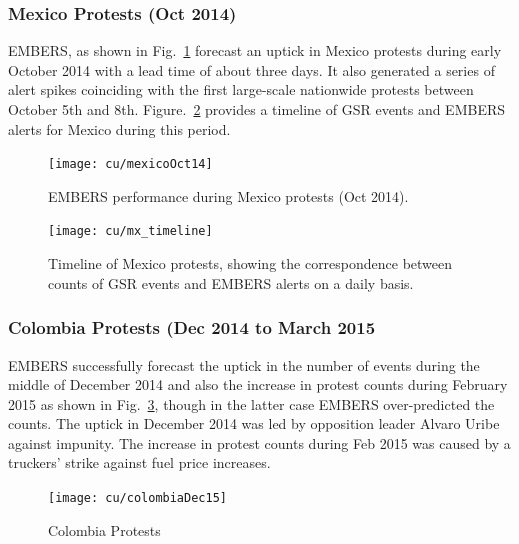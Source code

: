 \subsubsection*{Mexico Protests (Oct 2014)}

EMBERS, as shown in Fig.~\ref{fig:mexicoOct14} forecast an uptick in Mexico
protests during early October 2014 with a lead time of about three days.
It also generated  a series of alert spikes coinciding with the first
large-scale nationwide protests between October 5th and 8th.
Figure.~\ref{fig:mexicoTimeline} provides a timeline of GSR events and
EMBERS alerts for Mexico during this period. 

\begin{figure}[H]
\centering
\texttt{[image: cu/mexicoOct14]}
\caption{EMBERS performance during Mexico protests (Oct 2014).}
\label{fig:mexicoOct14}
\end{figure}

\begin{figure}[H]
\centering
\texttt{[image: cu/mx\_timeline]}
\caption{Timeline of Mexico protests, showing the correspondence
between counts of GSR events and EMBERS alerts on a daily basis.}
\label{fig:mexicoTimeline}
\end{figure}

\subsubsection*{Colombia Protests (Dec 2014 to March 2015}

EMBERS successfully forecast the uptick in the number of events during the
middle of December 2014 and also the increase in protest counts
during February 2015 as shown in Fig.~\ref{fig:colombiaDec14}, though in the
latter case EMBERS over-predicted the counts. The uptick in
December 2014 was led by opposition leader Alvaro Uribe against impunity.
The increase in protest counts during Feb 2015 was
caused by a truckers' strike against fuel price increases.

\begin{figure}[H]
\centering
\texttt{[image: cu/colombiaDec15]}
\caption{Colombia Protests }
\label{fig:colombiaDec14}
\end{figure}

